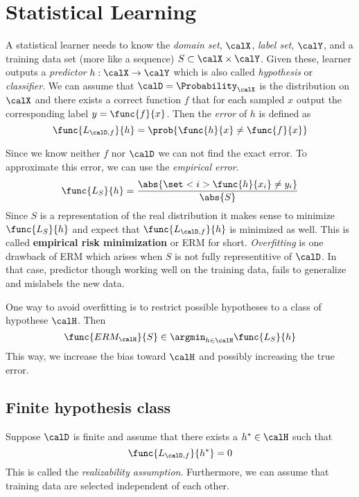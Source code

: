 \chapter{Statistical Learning}
A statistical learner needs to know the \textit{domain set}, \(\calX\), \textit{label set}, \(\calY\), and a training data set (more like a sequence) \(S \subset \calX \times \calY\). Given these, learner outputs a \textit{predictor} \(h : \calX \to \calY\) which is also called \textit{hypothesis} or \textit{classifier}. We can assume that \(\calD = \Probability_{\calX}\) is the distribution on \(\calX\) and there exists a correct function \(f\) that for each sampled \(x\) output the corresponding label \(y = \func{f}{x}\). Then the \textit{error} of \(h\) is defined as 
\begin{equation*}
    \func{L_{\calD, f}}{h} = \prob{\func{h}{x} \neq \func{f}{x}}
\end{equation*}

Since we know neither \(f\) nor \(\calD\) we can not find the exact error. To approximate this error, we can use the \textit{empirical error}.
\begin{equation*}
    \func{L_S}{h} = \dfrac{\abs{\set<i>{\func{h}{x_i} \neq y_i }}}{\abs{S}}
\end{equation*}
Since \(S\) is a representation of the real distribution it makes sense to minimize \(\func{L_S}{h}\) and expect that \(\func{L_{\calD,f}}{h}\) is minimized as well. This is called \textbf{empirical risk minimization} or ERM for short. \textit{Overfitting} is one drawback of ERM which arises when \(S\) is not fully representitive of \(\calD\). In that case, predictor though working well on the training data, fails to generalize and mislabels the new data. 

One way to avoid overfitting is to restrict possible hypotheses to a class of hypothese \(\calH\). Then 
\begin{equation*}
    \func{ERM_{\calH}}{S} \in \argmin_{h \in \calH} \func{L_S}{h}
\end{equation*}
This way, we increase the bias toward \(\calH\) and possibly increasing the true error.

\section{Finite hypothesis class}
Suppose \(\calD\) is finite and assume that there exists a \(h^{\ast} \in \calH\) such that 
\begin{equation*}
    \func{L_{\calD,f}}{h^{\ast}} = 0
\end{equation*}
This is called the \textit{realizability assumption}. Furthermore, we can assume that training data are selected independent of each other. 

